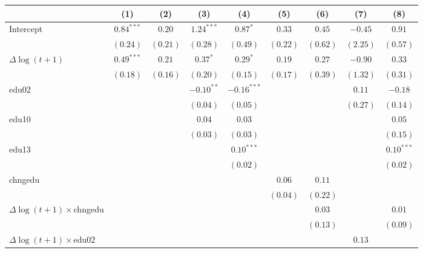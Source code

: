 
\begin{tabular}{l c c c c c c c c }
\hline
 & (1) & (2) & (3) & (4) & (5) & (6) & (7) & (8) \\
\hline
Intercept     & $0.84^{***}$ & $0.20$   & $1.24^{***}$ & $0.87^{*}$    & $0.33$   & $0.45$   & $-0.45$  & $0.91$       \\
                & $(0.24)$     & $(0.21)$ & $(0.28)$     & $(0.49)$      & $(0.22)$ & $(0.62)$ & $(2.25)$ & $(0.57)$     \\
$\Delta \log(t+1)$ & $0.49^{***}$ & $0.21$   & $0.37^{*}$   & $0.29^{*}$    & $0.19$   & $0.27$   & $-0.90$  & $0.33$       \\
                & $(0.18)$     & $(0.16)$ & $(0.20)$     & $(0.15)$      & $(0.17)$ & $(0.39)$ & $(1.32)$ & $(0.31)$     \\
edu02           &              &          & $-0.10^{**}$ & $-0.16^{***}$ &          &          & $0.11$   & $-0.18$      \\
                &              &          & $(0.04)$     & $(0.05)$      &          &          & $(0.27)$ & $(0.14)$     \\
edu10           &              &          & $0.04$       & $0.03$        &          &          &          & $0.05$       \\
                &              &          & $(0.03)$     & $(0.03)$      &          &          &          & $(0.15)$     \\
edu13           &              &          &              & $0.10^{***}$  &          &          &          & $0.10^{***}$ \\
                &              &          &              & $(0.02)$      &          &          &          & $(0.02)$     \\
chngedu         &              &          &              &               & $0.06$   & $0.11$   &          &              \\
                &              &          &              &               & $(0.04)$ & $(0.22)$ &          &              \\
$\Delta \log(t+1)\times$chngedu &              &          &              &               &          & $0.03$   &          & $0.01$       \\
                &              &          &              &               &          & $(0.13)$ &          & $(0.09)$     \\
$\Delta \log(t+1)\times$edu02   &              &          &              &               &          &          & $0.13$   &              \\

\end{tabular}
